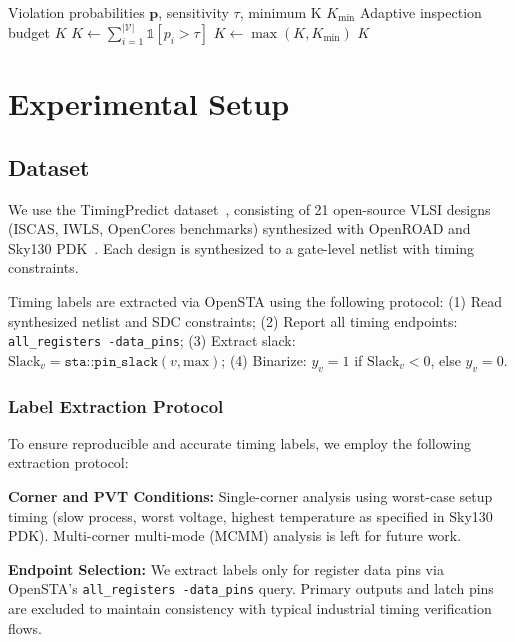 \documentclass[10pt,twocolumn,journal]{IEEEtran}
\begin{document}
\begin{algorithm}[t]
\caption{Adaptive K-Selection}
\label{alg:adaptive}
\begin{algorithmic}[1]
\REQUIRE Violation probabilities $\mathbf{p}$, sensitivity $\tau$, minimum K $K_{\text{min}}$
\ENSURE Adaptive inspection budget $K$
\STATE $K \leftarrow \sum_{i=1}^{|\mathcal{V}|} \mathbb{1}[p_i > \tau]$
\STATE $K \leftarrow \max(K, K_{\text{min}})$
\RETURN $K$
\end{algorithmic}
\end{algorithm}

\section{Experimental Setup}
\label{sec:setup}

\subsection{Dataset}

We use the TimingPredict dataset~\cite{guo2022timingpredict}, consisting of 21 open-source VLSI designs (ISCAS, IWLS, OpenCores benchmarks) synthesized with OpenROAD and Sky130 PDK~\cite{sky130pdk}. Each design is synthesized to a gate-level netlist with timing constraints.

Timing labels are extracted via OpenSTA using the following protocol:
(1) Read synthesized netlist and SDC constraints;
(2) Report all timing endpoints: \texttt{all\_registers -data\_pins};
(3) Extract slack: $\text{Slack}_v = \texttt{sta::pin\_slack}(v, \text{max})$;
(4) Binarize: $y_v = 1$ if $\text{Slack}_v < 0$, else $y_v = 0$.

\subsubsection{Label Extraction Protocol}

To ensure reproducible and accurate timing labels, we employ the following extraction protocol:

\textbf{Corner and PVT Conditions:} Single-corner analysis using worst-case setup timing (slow process, worst voltage, highest temperature as specified in Sky130 PDK). Multi-corner multi-mode (MCMM) analysis is left for future work.

\textbf{Endpoint Selection:} We extract labels only for register data pins via OpenSTA's \texttt{all\_registers -data\_pins} query. Primary outputs and latch pins are excluded to maintain consistency with typical industrial timing verification flows.
\end{document}
